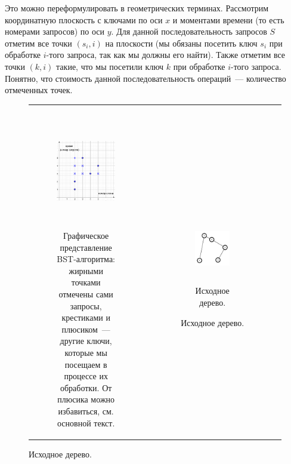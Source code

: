 Это можно переформулировать в геометрических терминах. Рассмотрим координатную
плоскость с ключами по оси $x$ и моментами времени (то есть номерами запросов) по 
оси $y$. Для данной последовательность запросов $S$ отметим все точки $(s_i, i)$ 
на плоскости (мы обязаны посетить ключ $s_i$ при обработке $i$-того
запроса, так как мы должны его найти). Также отметим все точки $(k, i)$ такие,
что мы посетили ключ $k$ при обработке $i$-того запроса. Понятно, что стоимость данной
последовательность операций~--- количество отмеченных точек.



\begin{figure}
    \centering
    \begin{tabular}{cc}
    
    \begin{subfigure}{0.6\textwidth} 
        \centering
        \includegraphics[height=5cm]{img/graph_repr_example.png}
        \caption{Графическое представление BST-алгоритма: жирными точками отмечены сами запросы, крестиками и плюсиком~--- другие ключи, которые мы посещаем в процессе их обработки. От плюсика можно избавиться, см. основной текст.}
        \label{repr_example_graph}
    \end{subfigure}
    
    &
    
    \begin{subfigure}{0.4\textwidth} 
        \centering
        \begin{subfigure}{0.4\textwidth}
        \includegraphics[height=3cm]{img/tree_original.png}
        \caption{Исходное дерево.}
        \label{repr_example_orig}
        \end{subfigure}
        

\end{subfigure}
\end{tabular}
\end{figure}
